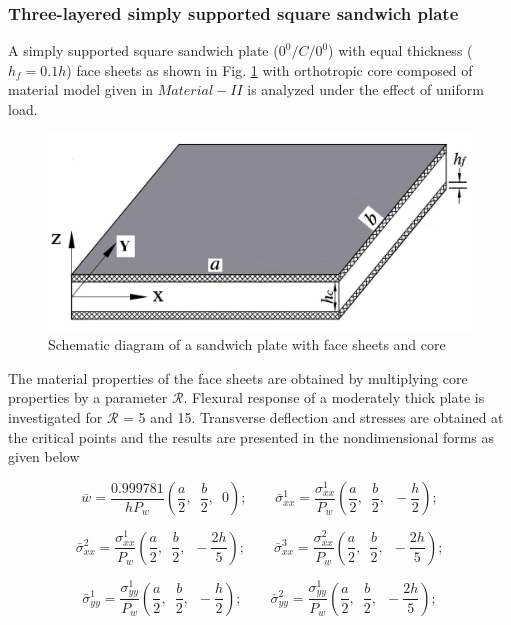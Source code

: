 \documentclass[3p,preprint,12pt]{elsarticle}
\begin{document}
\subsubsection{Three-layered simply supported square sandwich plate}	
A simply supported square sandwich plate ($0^0/C/0^0$) with equal thickness ($h_f=0.1h$) face sheets as shown in Fig. \ref{fig:Sandwich} with orthotropic core composed of material model given in $Material-II$ is analyzed under the effect of uniform load.

\begin{figure}
	\graphicspath{{./All_Images/}}
	\centering
	\includegraphics[scale=0.23]{sandwichplate}
	\caption{Schematic diagram of a sandwich plate with face sheets and core}%
	\label{fig:Sandwich}
\end{figure}

The material properties of the face sheets are obtained by multiplying core properties by a parameter $\mathcal{R}$. Flexural response of a moderately thick plate is investigated for $\mathcal{R}$ = 5 and 15. Transverse deflection and stresses are obtained at the critical points and the results are presented in the nondimensional forms as given below

\[
\bar{w}=\frac{0.999781}{hP_{w}}\left(\frac{a}{2},\,\,\,\frac{b}{2},\,\,\,0\right);\,\,\,\,\,\,\,\,\,\,\,\,\bar{\sigma}_{xx}^{1}=\frac{\sigma_{xx}^{1}}{P_{w}}\left(\frac{a}{2},\,\,\,\frac{b}{2},\,\,\,-\frac{h}{2}\right);
\]

\[
\bar{\sigma}_{xx}^{2}=\frac{\sigma_{xx}^{1}}{P_{w}}\left(\frac{a}{2},\,\,\,\frac{b}{2},\,\,\,-\frac{2h}{5}\right);\,\,\,\,\,\,\,\,\,\,\,\,\bar{\sigma}_{xx}^{3}=\frac{\sigma_{xx}^{2}}{P_{w}}\left(\frac{a}{2},\,\,\,\frac{b}{2},\,\,\,-\frac{2h}{5}\right);
\]

\[
\bar{\sigma}_{yy}^{1}=\frac{\sigma_{yy}^{1}}{P_{w}}\left(\frac{a}{2},\,\,\,\frac{b}{2},\,\,\,-\frac{h}{2}\right);\,\,\,\,\,\,\,\,\,\,\,\,\bar{\sigma}_{yy}^{2}=\frac{\sigma_{yy}^{1}}{P_{w}}\left(\frac{a}{2},\,\,\,\frac{b}{2},\,\,\,-\frac{2h}{5}\right);
\]
\end{document}
